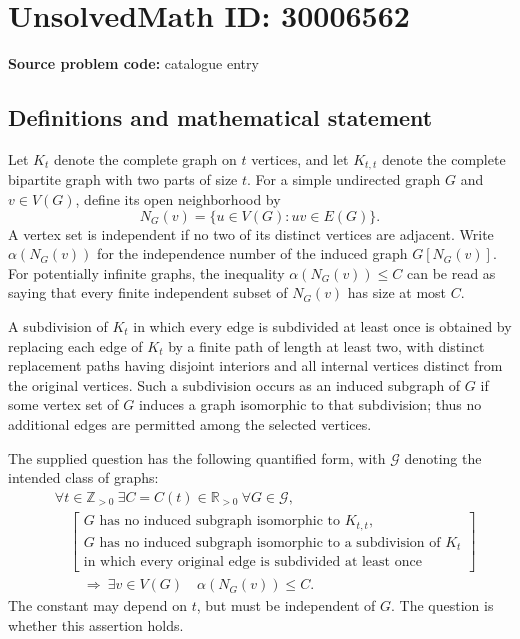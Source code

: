 \documentclass[11pt]{article}
\newcommand{\Z}{\mathbb{Z}}
\newcommand{\R}{\mathbb{R}}
\begin{document}
\section*{UnsolvedMath ID: 30006562}
\textbf{Source problem code:} catalogue entry
\subsection{Definitions and mathematical statement}
Let \(K_t\) denote the complete graph on \(t\) vertices, and let \(K_{t,t}\) denote the complete bipartite graph with two parts of size \(t\). For a simple undirected graph \(G\) and \(v\in V(G)\), define its open neighborhood by
\[
N_G(v)=\{u\in V(G):uv\in E(G)\}.
\]
A vertex set is independent if no two of its distinct vertices are adjacent. Write \(\alpha(N_G(v))\) for the independence number of the induced graph \(G[N_G(v)]\). For potentially infinite graphs, the inequality \(\alpha(N_G(v))\le C\) can be read as saying that every finite independent subset of \(N_G(v)\) has size at most \(C\).

A subdivision of \(K_t\) in which every edge is subdivided at least once is obtained by replacing each edge of \(K_t\) by a finite path of length at least two, with distinct replacement paths having disjoint interiors and all internal vertices distinct from the original vertices. Such a subdivision occurs as an induced subgraph of \(G\) if some vertex set of \(G\) induces a graph isomorphic to that subdivision; thus no additional edges are permitted among the selected vertices.

The supplied question has the following quantified form, with \(\mathcal G\) denoting the intended class of graphs:
\[
\begin{aligned}
&\forall t\in\Z_{>0}\ \exists C=C(t)\in\R_{>0}\ \forall G\in\mathcal G,\\
&\quad\left[\begin{array}{l}
G\text{ has no induced subgraph isomorphic to }K_{t,t},\\
G\text{ has no induced subgraph isomorphic to a subdivision of }K_t\\
\text{in which every original edge is subdivided at least once}
\end{array}\right]\\
&\qquad\Longrightarrow\ \exists v\in V(G)\quad \alpha(N_G(v))\le C.
\end{aligned}
\]
The constant may depend on \(t\), but must be independent of \(G\). The question is whether this assertion holds.
\end{document}
